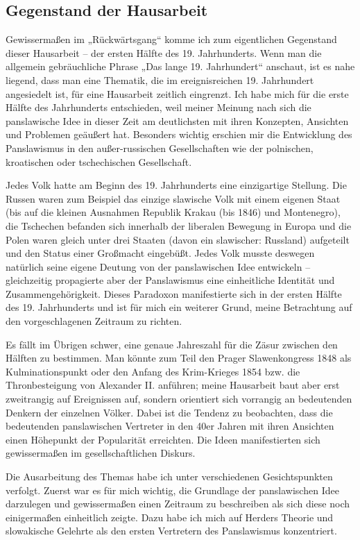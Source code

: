 \documentclass{../../sem_paper}
\begin{document}
\subsection*{Gegenstand der Hausarbeit}
Gewissermaßen im „Rückwärtsgang“ komme ich zum eigentlichen Gegenstand dieser
Hausarbeit – der ersten Hälfte des 19. Jahrhunderts. Wenn man die allgemein gebräuchliche
Phrase „Das lange 19. Jahrhundert“ anschaut, ist es nahe liegend, dass man eine Thematik, die
im ereignisreichen 19. Jahrhundert angesiedelt ist, für eine Hausarbeit zeitlich eingrenzt. Ich
habe mich für die erste Hälfte des Jahrhunderts entschieden, weil meiner Meinung nach sich
die panslawische Idee in dieser Zeit am deutlichsten mit ihren Konzepten, Ansichten und
Problemen geäußert hat. Besonders wichtig erschien mir die Entwicklung des Panslawismus
in den außer-russischen Gesellschaften wie der polnischen, kroatischen oder tschechischen
Gesellschaft.

Jedes Volk hatte am Beginn des 19. Jahrhunderts eine einzigartige Stellung. Die Russen waren
zum Beispiel das einzige slawische Volk mit einem eigenen Staat (bis auf die kleinen
Ausnahmen Republik Krakau (bis 1846) und Montenegro), die Tschechen befanden sich innerhalb der liberalen
Bewegung in Europa und die Polen waren gleich unter drei Staaten (davon ein slawischer:
Russland) aufgeteilt und den Status einer Großmacht eingebüßt. Jedes Volk
musste deswegen natürlich seine eigene Deutung von der panslawischen Idee entwickeln –
gleichzeitig
propagierte
aber
der
Panslawismus
eine
einheitliche
Identität
und
Zusammengehörigkeit. Dieses Paradoxon manifestierte sich in der ersten Hälfte des 19.
Jahrhunderts und ist für mich ein weiterer Grund, meine Betrachtung auf den vorgeschlagenen
Zeitraum zu richten.

Es fällt im Übrigen schwer, eine genaue Jahreszahl für die Zäsur zwischen den Hälften zu
bestimmen. Man könnte zum Teil den Prager Slawenkongress 1848 als Kulminationspunkt oder den Anfang des
Krim-Krieges 1854 bzw. die Thronbesteigung von Alexander II. anführen; meine Hausarbeit
baut aber erst zweitrangig auf Ereignissen auf, sondern orientiert sich vorrangig an
bedeutenden Denkern der einzelnen Völker. Dabei ist die Tendenz zu beobachten, dass die
bedeutenden panslawischen Vertreter in den 40er Jahren mit ihren Ansichten einen Höhepunkt
der Popularität erreichten. Die Ideen manifestierten sich gewissermaßen im gesellschaftlichen
Diskurs.

Die Ausarbeitung des Themas habe ich unter verschiedenen Gesichtspunkten verfolgt. Zuerst
war es für mich wichtig, die Grundlage der panslawischen Idee darzulegen und
gewissermaßen einen Zeitraum zu beschreiben als sich diese noch einigermaßen einheitlich
zeigte. Dazu habe ich mich auf Herders Theorie und slowakische Gelehrte als den ersten
Vertretern des Panslawismus konzentriert.
\end{document}
